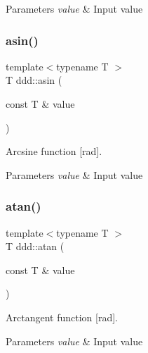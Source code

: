 \begin{DoxyParams}{Parameters}
{\em value} & Input value \\
\hline
\end{DoxyParams}
\mbox{\label{namespaceddd_af887d6f09da2128f99b36b034ab2ed1f}} 
\subsubsection{\texorpdfstring{asin()}{asin()}}
{\footnotesize\ttfamily template$<$typename T $>$ \\
T ddd\+::asin (\begin{DoxyParamCaption}\item[{const T \&}]{value }\end{DoxyParamCaption})\hspace{0.3cm}{\ttfamily [inline]}}



Arcsine function \mbox{[}rad\mbox{]}. 


\begin{DoxyParams}{Parameters}
{\em value} & Input value \\
\hline
\end{DoxyParams}
\mbox{\label{namespaceddd_a750f7cad6893bbbfbaa51353044bde4f}} 
\subsubsection{\texorpdfstring{atan()}{atan()}}
{\footnotesize\ttfamily template$<$typename T $>$ \\
T ddd\+::atan (\begin{DoxyParamCaption}\item[{const T \&}]{value }\end{DoxyParamCaption})\hspace{0.3cm}{\ttfamily [inline]}}



Arctangent function \mbox{[}rad\mbox{]}. 


\begin{DoxyParams}{Parameters}
{\em value} & Input value \\
\hline
\end{DoxyParams}
\mbox{\label{namespaceddd_a070060e53a22cb16f07576bfb5c4b1cc}} 

